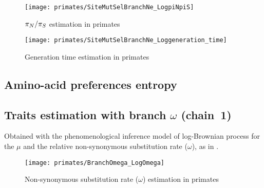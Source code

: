 \begin{figure}[H]
    \centering
    \texttt{[image: primates/SiteMutSelBranchNe\_LogpiNpiS]}
    \caption[$\pnps$ estimation in primates]{$\pnps$ estimation in primates}
\end{figure}

\begin{figure}[H]
    \centering
    \texttt{[image: primates/SiteMutSelBranchNe\_Loggeneration\_time]}
    \caption[Generation time estimation in primates]{Generation time estimation in primates}
\end{figure}

\subsection{Amino-acid preferences entropy}

\begin{table}[H]
    \centering
    \noindent{}
    \caption[Amino-acid entropy in primates]{Estimated amino-acid entropy in primates.
    Obtained with the mechanistic inference model developed in this paper of site-specific amino-acid fitness profiles and log-Brownian process for $\Ne$, $\mu$ and life-history traits (in the left column), or under the assumption of constant $\Ne$ (in the right column).}
\end{table}

\subsection{Traits estimation with branch \texorpdfstring{$\omega$}{ω} (chain~1)}
Obtained with the phenomenological inference model of log-Brownian process for the $\mu$ and the relative {non-synonymous} {substitution} rate ($\omega$), as in \citet{Lartillot2011}.

\begin{figure}[H]
    \centering
    \texttt{[image: primates/BranchOmega\_LogOmega]}
    \caption[$\omega$ estimation in primates]{{Non-synonymous substitution} rate ($\omega$) estimation in primates}
\end{figure}

